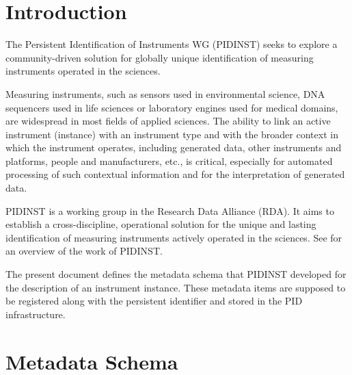 \documentclass[titlepage=true,twoside=false,DIV=13]{scrartcl}
\begin{document}
\tableofcontents
\cleardoublepage
{}

\section{Introduction}

The Persistent Identification of Instruments WG (PIDINST) seeks to
explore a community-driven solution for globally unique identification
of measuring instruments operated in the sciences.

Measuring instruments, such as sensors used in environmental science,
DNA sequencers used in life sciences or laboratory engines used for
medical domains, are widespread in most fields of applied sciences.
The ability to link an active instrument (instance) with an instrument
type and with the broader context in which the instrument operates,
including generated data, other instruments and platforms, people and
manufacturers, etc., is critical, especially for automated processing
of such contextual information and for the interpretation of generated
data.

PIDINST is a working group in the Research Data Alliance (RDA).  It
aims to establish a cross-discipline, operational solution for the
unique and lasting identification of measuring instruments actively
operated in the sciences.  See \cite{pidinst2020} for an overview of
the work of PIDINST.

The present document defines the metadata schema that PIDINST
developed for the description of an instrument instance.  These
metadata items are supposed to be registered along with the persistent
identifier and stored in the PID infrastructure.

\section{Metadata Schema}

\newlength{\idcolw}\settowidth{\idcolw}{5.3.1}
\newlength{\propcolw}\settowidth{\propcolw}{instrumentTypeIdentifierType}
\newlength{\occcolw}
\newlength{\valcolw}\settowidth{\valcolw}{Controlled list of values:}
\setlength{\defcolw}{\textwidth}
\addtolength{\defcolw}{-\idcolw}
\addtolength{\defcolw}{-\propcolw}
\addtolength{\defcolw}{-\occcolw}
\addtolength{\defcolw}{-\valcolw}
\addtolength{\defcolw}{-10\tabcolsep}
\end{document}
